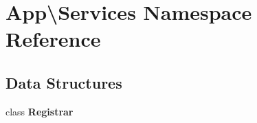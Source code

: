 \section{App\textbackslash{}Services Namespace Reference}
\label{namespace_app_1_1_services}
\subsection*{Data Structures}
\begin{DoxyCompactItemize}
\item 
class {\bf Registrar}
\end{DoxyCompactItemize}

